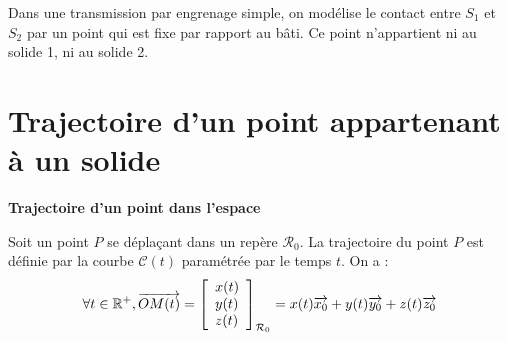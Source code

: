 \documentclass[10pt,oneside]{article}
\begin{document}
\begin{minipage}[c]{.23\linewidth}
Dans une transmission par engrenage simple, on modélise le contact entre $S_1$ et $S_2$ par un point qui est fixe par rapport au bâti. Ce point n'appartient ni au solide 1, ni au solide 2.
\end{minipage}


\section{Trajectoire d'un point appartenant à un solide}


\begin{defi}
\textbf{Trajectoire d'un point dans l'espace}

Soit un point $P$ se déplaçant dans un repère $\mathcal{R}_0$. La trajectoire du point $P$ est définie par la courbe $\mathcal{C}(t)$ paramétrée par le temps $t$. On a : 
$$
\forall t\in \mathbb{R}^+, \overrightarrow{OM(t)}=
\left[
\begin{array}{l}
x(t)\\
y(t)\\
z(t)\\
\end{array}
\right]_{\mathcal{R}_0}
=x(t)\overrightarrow{x_0}+y(t)\overrightarrow{y_0}+z(t)\overrightarrow{z_0}
$$
\end{defi}
\end{document}

